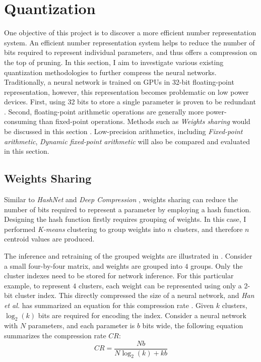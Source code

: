 \documentclass[a4paper,12pt]{report}
\begin{document}
\chapter{Quantization}
One objective of this project is to discover a
more efficient number representation system.
An efficient number representation system helps to reduce the number of bits
required to represent individual parameters, and thus offers a compression
on the top of pruning.
In this section, I aim to investigate various existing quantization methodologies to further
compress the neural networks.
Traditionally, a neural network is trained on GPUs in 32-bit floating-point
representation, however, this representation becomes problematic on low power devices.
First, using 32 bits to store a single parameter is proven to be redundant
\cite{mellempudi2017mixed}.
Second, floating-point arithmetic operations are generally more power-consuming than
fixed-point operations.
Methods such as \textit{Weights sharing} would be discussed in this section
\cite{Han15}.
Low-precision arithmetics, including \textit{Fixed-point arithmetic}, \textit{Dynamic fixed-point
arithmetic} will also be compared
and evaluated in this section.

\section{Weights Sharing}
Similar to \textit{HashNet} \cite{chen2015compressing} and \textit{Deep Compression}
\cite{Han15}, weights sharing can reduce the number of bits required
to represent a parameter by employing a hash function.
Designing the hash function firstly requires grouping of weights.
In this case, I performed \textit{K-means} clustering \cite{kanungo2002efficient}
to group weights into $n$ clusters, and therefore $n$ centroid values are produced.

The inference and retraining of the grouped weights are illustrated in
.
Consider a small four-by-four matrix, and weights are grouped into $4$ groups.
Only the cluster indexes need to be stored for network inference.
For this particular example, to represent $4$ clusters, each weight can
be represented using only a 2-bit cluster index.
This directly compressed the size of a neural network, and \textit{Han et al.}
has summarized an equation for this compression rate \cite{Han15}.
Given $k$ clusters, $\log_{2}(k)$ bits are required for encoding the index.
Consider a neural network with $N$ parameters, and each parameter is $b$ bits
wide, the following equation summarizes the compression rate $CR$:
\begin{equation}
CR = \frac{Nb}{N\log_2(k) + kb}
\label{equ:weightsshare_cr}
\end{equation}
\end{document}
